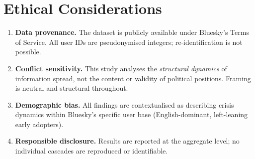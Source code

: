 \documentclass[12pt,a4paper]{article}
\begin{document}
\section{Ethical Considerations}

\begin{enumerate}[label=\textbf{(\arabic*)}]
  \item \textbf{Data provenance.} The \citet{failla2024bluesky} dataset is
        publicly available under Bluesky's Terms of Service.  All user IDs are
        pseudonymised integers; re-identification is not possible.
  \item \textbf{Conflict sensitivity.} This study analyses the
        \emph{structural dynamics} of information spread, not the content or
        validity of political positions.  Framing is neutral and structural
        throughout.
  \item \textbf{Demographic bias.} All findings are contextualised as
        describing crisis dynamics within Bluesky's specific user base
        (English-dominant, left-leaning early adopters).
  \item \textbf{Responsible disclosure.} Results are reported at the aggregate
        level; no individual cascades are reproduced or identifiable.
\end{enumerate}


\newpage
\printbibliography
\end{document}
